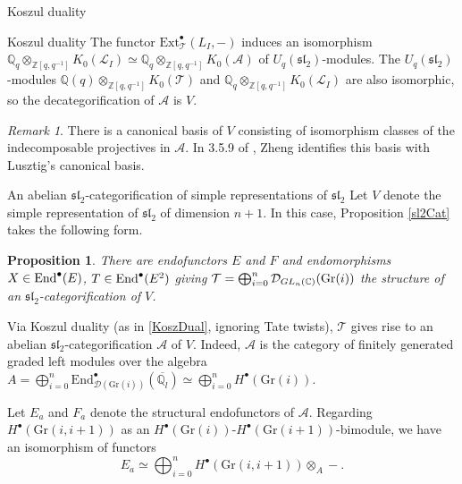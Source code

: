 \documentclass[12pt]{amsart}
\newtheorem{prpn}[thm]{Proposition}
\theoremstyle{definition}
\theoremstyle{remark}
\newtheorem{rmk}[thm]{Remark}
\theoremstyle{remark}
\begin{document}
\begin{section}{Koszul duality}
\begin{subsection}{Koszul duality}
The functor $\text{Ext}^{\bullet}_{\mathcal{T}}(L_{I},-)$ induces an isomorphism $\mathbb{Q}_{q} \otimes_{\mathbb{Z}[q,q^{-1}]} K_{0}(\mathcal{L}_{I}) \simeq \mathbb{Q}_{q} \otimes_{\mathbb{Z}[q,q^{-1}]} K_{0}(\mathcal{A})$ of $U_{q}(\mathfrak{sl}_{2})$-modules. The $U_{q}(\mathfrak{sl}_{2})$-modules $\mathbb{Q}(q) \otimes_{\mathbb{Z}[q,q^{-1}]} K_{0}(\mathcal{T})$ and $\mathbb{Q}_{q} \otimes_{\mathbb{Z}[q,q^{-1}]} K_{0}(\mathcal{L}_{I})$ are also isomorphic, so the decategorification of $\mathcal{A}$ is $V$.   

\begin{rmk} \label{CanonicalBasis} There is a canonical basis of $V$ consisting of isomorphism classes of the indecomposable projectives in $\mathcal{A}$. In 3.5.9 of \cite{ZhengCategorificationIntegrableRepresentationsQuantumGroups}, Zheng identifies this basis with Lusztig's canonical basis. 
\end{rmk}

\end{subsection}

\begin{subsection}{An abelian $\mathfrak{sl}_{2}$-categorification of simple representations of $\mathfrak{sl}_{2}$} \label{RecovAbCatSimp} Let $V$ denote the simple representation of $\mathfrak{sl}_{2}$ of dimension $n+1$. In this case, Proposition \ref{sl2Cat} takes the following form.

\begin{prpn} \label{SimpleCat} There are endofunctors $E$ and $F$ and endomorphisms $X \in {\rm End}^{\bullet}(E)$, $T \in {\rm End}^{\bullet}(E^{2})$ giving $\mathcal{T} = \bigoplus_{i=0}^{n} \mathcal{D}_{GL_{n}(\mathbb{C})}({\rm Gr}(i))$ the structure of an $\mathfrak{sl}_{2}$-categorification of $V$. \end{prpn} 

Via Koszul duality (as in \ref{KoszDual}, ignoring Tate twists), $\mathcal{T}$ gives rise to an abelian $\mathfrak{sl}_{2}$-categorification $\mathcal{A}$ of $V$. Indeed, $\mathcal{A}$ is the category of finitely generated graded left modules over the algebra $A = \bigoplus_{i=0}^{n} \text{End}_{\mathcal{D}(\text{Gr}(i))}^{\bullet}(\overline{\mathbb{Q}_{l}}) \simeq \bigoplus_{i=0}^{n} H^{\bullet}(\text{Gr}(i))$. 

Let $E_{a}$ and $F_{a}$ denote the structural endofunctors of $\mathcal{A}$. Regarding $H^{\bullet}(\text{Gr}(i,i+1))$ as an $H^{\bullet}(\text{Gr}(i))\text{-}H^{\bullet}(\text{Gr}(i+1))$-bimodule, we have an isomorphism of functors \[ E_{a}  \simeq \bigoplus_{i=0}^{n} H^{\bullet}(\text{Gr}(i,i+1)) \otimes_{A} -. \]


\end{subsection}
\end{section}
\end{document}
